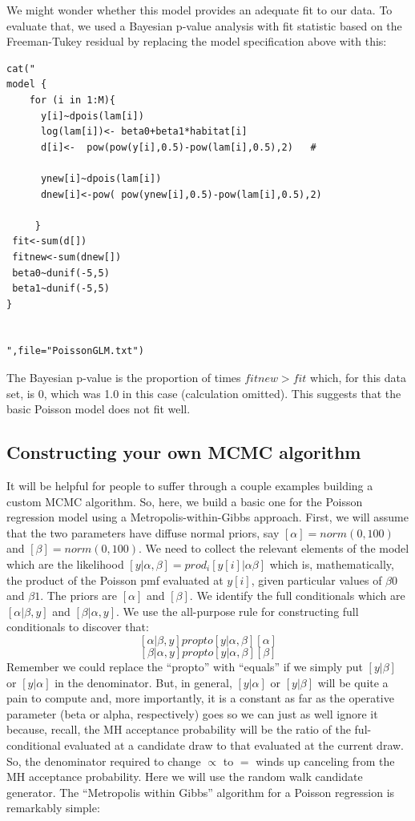 We might wonder whether this model provides an adequate fit to our data.  To evaluate that, we used a Bayesian p-value analysis with fit statistic based on the Freeman-Tukey residual by replacing the model specification above with this:

\begin{verbatim}
cat("
model {
    for (i in 1:M){
      y[i]~dpois(lam[i])
      log(lam[i])<- beta0+beta1*habitat[i]
      d[i]<-  pow(pow(y[i],0.5)-pow(lam[i],0.5),2)   #

      ynew[i]~dpois(lam[i])
      dnew[i]<-pow( pow(ynew[i],0.5)-pow(lam[i],0.5),2)

     }
 fit<-sum(d[])
 fitnew<-sum(dnew[])
 beta0~dunif(-5,5)
 beta1~dunif(-5,5)
}


",file="PoissonGLM.txt")
\end{verbatim}
The Bayesian p-value is the proportion of times $fitnew > fit$ which, for this data set, is 0, which was 1.0 in this case (calculation omitted). This suggests that the basic Poisson model does not fit well. 


\subsection{ Constructing your own MCMC algorithm}

It will be helpful for people to suffer through a couple examples building a custom MCMC algorithm. So, here, we build a basic one for the Poisson regression model using a Metropolis-within-Gibbs approach. First, we will assume that the two parameters have diffuse normal priors, say $[\alpha] = norm(0,100)$ and $[\beta]=norm(0,100)$.  We need to collect the relevant elements of the model which are the likelihood $[y|\alpha,\beta] = prod_{i} [y[i]|\alpha\beta] $ which is, mathematically, the product of the Poisson pmf evaluated at $y[i]$, given particular values of $\beta0$ and $\beta1$. The priors are $[\alpha]$ and $[\beta]$. We identify the full conditionals which are $[\alpha|\beta, y]$ and $[\beta|\alpha,y]$.  We use the all-purpose rule for constructing full conditionals to discover that:
\[
 [\alpha|\beta,y] propto [y|\alpha,\beta][\alpha] 
\]
\[
 [\beta|\alpha,y] propto [y|\alpha,\beta][\beta]
\]
Remember we could replace the ``propto'' with ``equals'' if we simply put $[y|\beta]$ or $[y|\alpha]$ in the denominator. But, in general, $[y|\alpha]$ or $[y|\beta]$ will be quite a pain to compute and, more importantly, it is a constant as far as the operative parameter (beta or alpha, respectively) goes so we can just as well ignore it because, recall, the MH acceptance probability will be the ratio of the ful-conditional evaluated at a candidate draw to that evaluated at the current draw. So, the denominator required to change $\propto$ to $=$ winds up canceling from the MH acceptance probability.  Here we will use the random walk candidate generator.  The ``Metropolis within Gibbs'' algorithm for a Poisson regression is remarkably simple:

